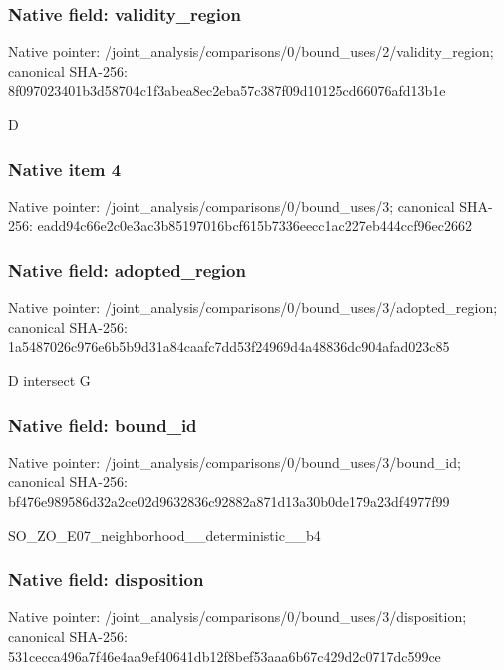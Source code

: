 \documentclass[10pt,a4paper]{article}
\begin{document}
\subsubsection{Native field: validity\_\allowbreak{}region}
Native pointer: /joint\_\allowbreak{}analysis/comparisons/0/bound\_\allowbreak{}uses/2/validity\_\allowbreak{}region; canonical SHA-256: 8f097023401b3d58704c1f3abea8ec2eba57c387f09d10125cd66076afd13b1e

\begingroup\raggedright\sloppy D\par\endgroup

\subsubsection{Native item 4}
Native pointer: /joint\_\allowbreak{}analysis/comparisons/0/bound\_\allowbreak{}uses/3; canonical SHA-256: eadd94c66e2c0e3ac3b85197016bcf615b7336eecc1ac227eb444ccf96ec2662

\subsubsection{Native field: adopted\_\allowbreak{}region}
Native pointer: /joint\_\allowbreak{}analysis/comparisons/0/bound\_\allowbreak{}uses/3/adopted\_\allowbreak{}region; canonical SHA-256: 1a5487026c976e6b5b9d31a84caafc7dd53f24969d4a48836dc904afad023c85

\begingroup\raggedright\sloppy D intersect G\par\endgroup

\subsubsection{Native field: bound\_\allowbreak{}id}
Native pointer: /joint\_\allowbreak{}analysis/comparisons/0/bound\_\allowbreak{}uses/3/bound\_\allowbreak{}id; canonical SHA-256: bf476e989586d32a2ce02d9632836c92882a871d13a30b0de179a23df4977f99

\begingroup\raggedright\sloppy SO\_\allowbreak{}ZO\_\allowbreak{}E07\_\allowbreak{}neighborhood\_\allowbreak{}\_\allowbreak{}deterministic\_\allowbreak{}\_\allowbreak{}b4\par\endgroup

\subsubsection{Native field: disposition}
Native pointer: /joint\_\allowbreak{}analysis/comparisons/0/bound\_\allowbreak{}uses/3/disposition; canonical SHA-256: 531cecca496a7f46e4aa9ef40641db12f8bef53aaa6b67c429d2c0717dc599ce
\end{document}
